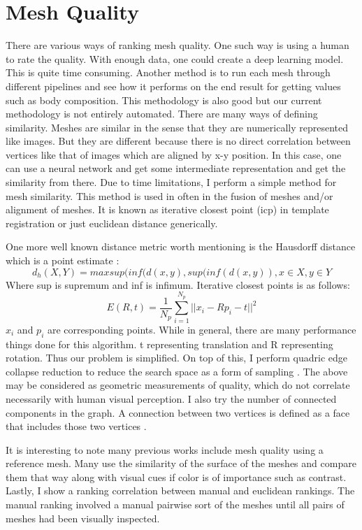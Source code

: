 \section{Mesh Quality}
There are various ways of ranking mesh quality. One such way is using a human to rate the quality. With enough data, one could create a deep learning model. This is quite time consuming. Another method is to run each mesh through different pipelines and see how it performs on the end result for getting values such as body composition. This methodology is also good but our current methodology is not entirely automated. There are many ways of defining similarity. Meshes are similar in the sense that they are numerically represented like images. But they are different because there is no direct correlation between vertices like that of images which are aligned by x-y position. In this case, one can use a neural network and get some intermediate representation and get the similarity from there. Due to time limitations, I perform a simple method for mesh similarity. This method is used in often in the fusion of meshes and/or alignment of meshes. It is known as iterative closest point (icp) in template registration or just euclidean distance generically.

One more well known distance metric worth mentioning is the Hausdorff distance which is a point estimate \cite{huttenlocher1993comparing}:
\begin{equation}
	d_h(X, Y) = max{sup(inf(d(x, y),sup(inf(d(x,y))}, x\in X, y\in Y
\end{equation}
Where sup is supremum and inf is infimum.
Iterative closest points is as follows:
\begin{equation}
	E(R, t) = \frac{1}{N_p}\sum_{i=1}^{N_p}||x_i - Rp_i - t||^2
\end{equation}
$x_i$ and $p_i$ are corresponding points.
While in general, there are many performance things done for this algorithm. t representing translation and R representing rotation. Thus our problem is simplified. On top of this, I perform quadric edge collapse reduction to reduce the search space as a form of sampling \cite{hussain2004efficient}.
The above may be considered as geometric measurements of quality, which do not correlate necessarily with human visual perception. I also try the number of connected components in the graph. A connection between two vertices is defined as a face that includes those two vertices \cite{chung2002connected}.

It is interesting to note many previous works include mesh quality using a reference mesh. Many use the similarity of the surface of the meshes and compare them that way along with visual cues if color is of importance such as contrast. Lastly, I show a ranking correlation between manual and euclidean rankings. The manual ranking involved a manual pairwise sort of the meshes until all pairs of meshes had been visually inspected.
